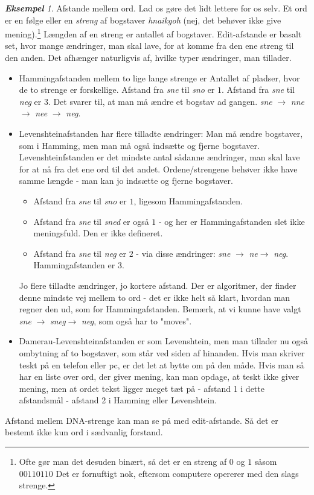 \documentclass[a4paper, 12pt]{article}
\theoremstyle{remark}
\newtheorem{Eksempel}{\textbf{Eksempel}}
\begin{document}
\begin{Eksempel}
Afstande mellem ord. Lad os gøre det lidt lettere for os selv. 
Et ord er en følge eller en \emph{streng} af bogstaver \emph{hnaikgoh} (nej, det behøver ikke give mening).\footnote{Ofte gør man det desuden binært, så det er en streng af $0$ og $1$ såsom $00110110$ Det er fornuftigt nok, eftersom computere opererer med den slags strenge.}
 Længden af en streng er antallet af bogstaver.
Edit-afstande er basalt set, hvor mange ændringer, man skal lave, for at komme fra den ene streng til den anden. Det afhænger naturligvis af, hvilke typer ændringer, man tillader. 
\begin{itemize}
\item Hammingafstanden mellem to lige lange strenge er Antallet af pladser, hvor de to strenge er forskellige. 
Afstand fra \emph{sne} til \emph{sno} er $1$. Afstand fra \emph{sne} til \emph{neg} er $3$. 
Det svarer til, at man må ændre et bogstav ad gangen. \emph{sne} $\rightarrow$ \emph{nne} $\rightarrow$ \emph{nee} $\rightarrow$ \emph{neg}.
\item Levenshteinafstanden har flere tilladte ændringer:  
Man må ændre bogstaver, som i Hamming, men man må også indsætte og fjerne bogstaver. 
Levenshteinfstanden er det mindste antal sådanne ændringer, man skal  lave for at nå fra det ene ord til det andet. 
Ordene/strengene behøver ikke have samme længde - man kan jo indsætte og fjerne bogstaver. 
\begin{itemize}
\item Afstand fra  \emph{sne} til \emph{sno} er $1$, ligesom Hammingafstanden. 
\item Afstand fra \emph{sne} til \emph{sned} er også $1$ - og her er Hammingafstanden slet ikke meningsfuld. Den er ikke defineret.
\item Afstand fra \emph{sne} til \emph{neg} er $2$ - via disse ændringer: \emph{sne} $\rightarrow$ \emph{ne}$\rightarrow$ \emph{neg}. Hammingafstanden er 3. 
\end{itemize}
Jo flere tilladte ændringer, jo kortere afstand. Der er algoritmer, der finder denne mindste vej mellem to ord - det er ikke helt så klart, hvordan man regner den ud, som for Hammingafstanden.
 Bemærk, at vi kunne have valgt \emph{sne} $\rightarrow$ \emph{sneg}$\rightarrow$ \emph{neg}, som også har to "moves". 
\item Damerau-Levenshteinafstanden er som Levenshtein, men man tillader nu også ombytning af to bogstaver, som står ved siden af hinanden. 
Hvis man skriver teskt på en telefon eller pc, er det let at bytte om på den måde. 
Hvis man så har en liste over ord, der giver mening, kan man opdage, at teskt ikke giver mening, men at ordet tekst ligger meget tæt på - afstand 1 i dette afstandsmål - afstand 2 i Hamming eller Levenshtein.
\end{itemize}
Afstand mellem DNA-strenge kan man se på med edit-afstande. Så det er bestemt ikke kun ord i sædvanlig forstand. 
\end{Eksempel}
\end{document}
